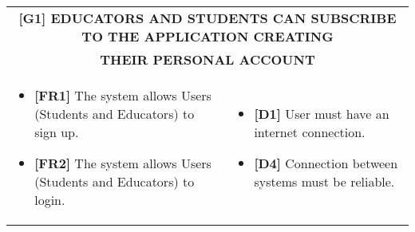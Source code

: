 \documentclass{article}
\begin{document}
\begin{table}[H]
\begin{adjustwidth}{-1in}{-1in}
 \renewcommand{\arraystretch}{1.5}
    \begin{tabular}{|p{9.5cm}|p{9.5cm}|}
        \hline
        \multicolumn{2}{|c|}{\textbf{[G1] EDUCATORS AND STUDENTS CAN SUBSCRIBE TO THE APPLICATION CREATING}} \\
        \multicolumn{2}{|c|}{\textbf{THEIR PERSONAL ACCOUNT}}\\
        \hline
        \begin{itemize}[label={}, left=0pt, align=left, itemsep=5pt]
            \item \textbf{[FR1]} The system allows Users (Students and Educators) to sign up.
            \item \textbf{[FR2]} The system allows Users (Students and Educators) to login.
        \end{itemize} &
        \begin{itemize} [label={}, left=0pt, align=left, itemsep=5pt]
            \item \textbf{[D1]} User must have an internet connection. 
            \item \textbf{[D4]} Connection between systems must be reliable.
        \end{itemize} \\
        \hline
    \end{tabular}
\end{adjustwidth}
\end{table}
\end{document}
